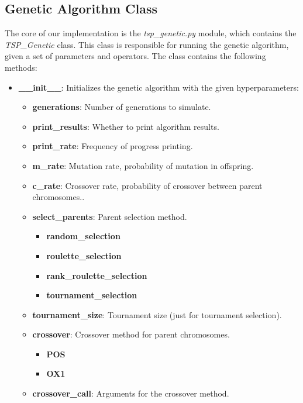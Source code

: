 \documentclass[11pt]{article}
\begin{document}
\subsection{Genetic Algorithm Class}
The core of our implementation is the \textit{tsp\_genetic.py} module, which contains the \textit{TSP\_Genetic} class. This class is responsible for running the genetic algorithm, given a set of parameters and operators. The class contains the following methods:
\begin{itemize}
    \item \textbf{\_\_init\_\_}: Initializes the genetic algorithm with the given hyperparameters:
        \begin{itemize}
            \item \textbf{generations}: Number of generations to simulate.
            \item \textbf{print\_results}: Whether to print algorithm results.
            \item \textbf{print\_rate}: Frequency of progress printing.
            \item \textbf{m\_rate}: Mutation rate, probability of mutation in offspring.
            \item \textbf{c\_rate}: Crossover rate, probability of crossover between parent chromosomes..
            \item \textbf{select\_parents}: Parent selection method.
                \begin{itemize}
                    \item \textbf{random\_selection}
                    \item \textbf{roulette\_selection}
                    \item \textbf{rank\_roulette\_selection}
                    \item \textbf{tournament\_selection}
                \end{itemize}
            \item \textbf{tournament\_size}: Tournament size (just for tournament selection).
            \item \textbf{crossover}: Crossover method for parent chromosomes.
                \begin{itemize}
                    \item \textbf{POS}
                    \item \textbf{OX1}
                \end{itemize}
            \item \textbf{crossover\_call}: Arguments for the crossover method.

\end{itemize}
\end{itemize}
\end{document}
